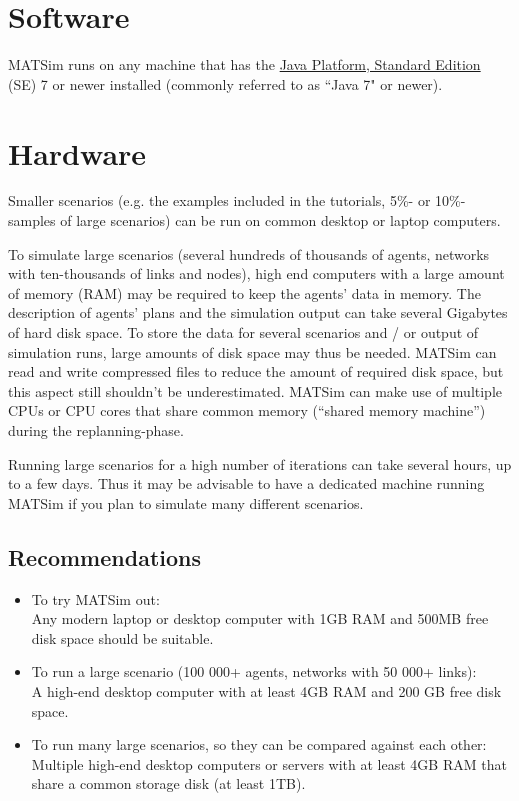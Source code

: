 
\bigskip


\section{Software}

MATSim runs on any machine that has the \href{http://java.sun.com/javase/downloads/index.jsp}{Java Platform, Standard Edition} (SE) 7 or newer installed (commonly referred to as ``Java 7" or newer).

\section{Hardware}

Smaller  scenarios (e.g. the examples included in the tutorials, 5\%- or  10\%-samples of large scenarios) can be run on common desktop or laptop  computers.

To simulate large scenarios (several hundreds of  thousands of agents, networks with ten-thousands of links and nodes),  high end computers with a large amount of memory (RAM) may be required  to keep the agents' data in memory. The description of agents' plans and  the simulation output can take several Gigabytes of hard disk space. To  store the data for several scenarios and / or output of simulation  runs, large amounts of disk space may thus be needed. MATSim can read  and write compressed files to reduce the amount of required disk space,  but this aspect still shouldn't be underestimated. MATSim can make use  of multiple CPUs or CPU cores that share common memory (``shared memory  machine'') during the replanning-phase.

Running large scenarios for  a high number of iterations can take several hours, up to a few days.  Thus it may be advisable to have a dedicated machine running MATSim if  you plan to simulate many different scenarios.

\subsection{Recommendations}
\begin{itemize}
	\item To try MATSim out:
\\Any modern laptop or desktop computer with 1GB RAM and 500MB free disk space should be suitable.
	\item To run a large scenario (100 000+ agents, networks with 50 000+ links): 
\\A high-end desktop computer with at least 4GB RAM and 200 GB free disk space.
	\item To run many large scenarios, so they can be compared against each other: 
\\Multiple high-end desktop computers or servers with at least 4GB RAM that share a common storage disk (at least 1TB).
\end{itemize}

